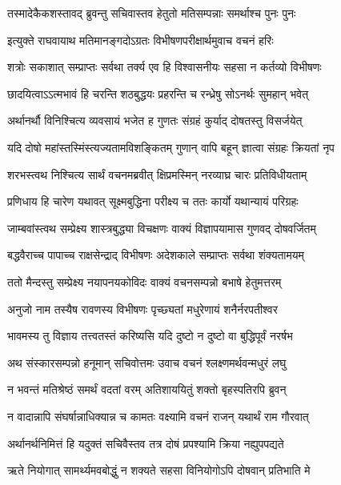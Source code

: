 \twolineshloka
{तस्मादेकैकशस्तावद् ब्रुवन्तु सचिवास्तव}
{हेतुतो मतिसम्पन्नाः समर्थाश्च पुनः पुनः} %

\twolineshloka
{इत्युक्ते राघवायाथ मतिमानङ्गदोऽग्रतः}
{विभीषणपरीक्षार्थमुवाच वचनं हरिः} %

\twolineshloka
{शत्रोः सकाशात् सम्प्राप्तः सर्वथा तर्क्य एव हि}
{विश्वासनीयः सहसा न कर्तव्यो विभीषणः} %

\twolineshloka
{छादयित्वाऽऽत्मभावं हि चरन्ति शठबुद्धयः}
{प्रहरन्ति च रन्ध्रेषु सोऽनर्थः सुमहान् भवेत्} %

\twolineshloka
{अर्थानर्थौ विनिश्चित्य व्यवसायं भजेत ह}
{गुणतः संग्रहं कुर्याद् दोषतस्तु विसर्जयेत्} %

\twolineshloka
{यदि दोषो महांस्तस्मिंस्त्यज्यतामविशङ्कितम्}
{गुणान् वापि बहून् ज्ञात्वा संग्रहः क्रियतां नृप} %

\twolineshloka
{शरभस्त्वथ निश्चित्य सार्थं वचनमब्रवीत्}
{क्षिप्रमस्मिन् नरव्याघ्र चारः प्रतिविधीयताम्} %

\twolineshloka
{प्रणिधाय हि चारेण यथावत् सूक्ष्मबुद्धिना}
{परीक्ष्य च ततः कार्यो यथान्यायं परिग्रहः} %

\twolineshloka
{जाम्बवांस्त्वथ सम्प्रेक्ष्य शास्त्रबुद्ध्या विचक्षणः}
{वाक्यं विज्ञापयामास गुणवद् दोषवर्जितम्} %

\twolineshloka
{बद्धवैराच्च पापाच्च राक्षसेन्द्राद् विभीषणः}
{अदेशकाले सम्प्राप्तः सर्वथा शंक्यतामयम्} %

\twolineshloka
{ततो मैन्दस्तु सम्प्रेक्ष्य नयापनयकोविदः}
{वाक्यं वचनसम्पन्नो बभाषे हेतुमत्तरम्} %

\twolineshloka
{अनुजो नाम तस्यैष रावणस्य विभीषणः}
{पृच्छ्यतां मधुरेणायं शनैर्नरपतीश्वर} %

\twolineshloka
{भावमस्य तु विज्ञाय तत्त्वतस्तं करिष्यसि}
{यदि दुष्टो न दुष्टो वा बुद्धिपूर्वं नरर्षभ} %

\twolineshloka
{अथ संस्कारसम्पन्नो हनूमान् सचिवोत्तमः}
{उवाच वचनं श्लक्ष्णमर्थवन्मधुरं लघु} %

\twolineshloka
{न भवन्तं मतिश्रेष्ठं समर्थं वदतां वरम्}
{अतिशाययितुं शक्तो बृहस्पतिरपि ब्रुवन्} %

\twolineshloka
{न वादान्नापि संघर्षान्नाधिक्यान्न च कामतः}
{वक्ष्यामि वचनं राजन् यथार्थं राम गौरवात्} %

\twolineshloka
{अर्थानर्थनिमित्तं हि यदुक्तं सचिवैस्तव}
{तत्र दोषं प्रपश्यामि क्रिया नह्युपपद्यते} %

\twolineshloka
{ऋते नियोगात् सामर्थ्यमवबोद्धुं न शक्यते}
{सहसा विनियोगोऽपि दोषवान् प्रतिभाति मे} %

